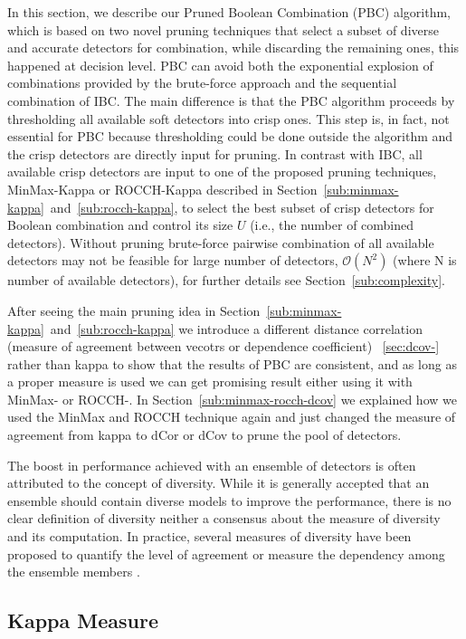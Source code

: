 In this section, we describe our Pruned Boolean Combination (PBC) algorithm, which is based on two novel pruning techniques that select a subset of diverse and accurate detectors for combination, while discarding the remaining ones, this happened at decision level.
PBC can avoid both the exponential explosion of combinations provided by the brute-force approach and the sequential combination of IBC.
The main difference is that the PBC algorithm proceeds by thresholding all available soft detectors into crisp ones.
This step is, in fact, not essential for PBC because thresholding could be done outside the algorithm and the crisp detectors are directly input for pruning.
In contrast with IBC, all available crisp detectors are input to one of the proposed pruning techniques, MinMax-Kappa or ROCCH-Kappa described in Section~\ref{sub:minmax-kappa}~and~\ref{sub:rocch-kappa}, to select the best subset of crisp detectors for Boolean combination and control its size $U$ (i.e., the number of combined detectors).
Without pruning brute-force pairwise combination of all available detectors may not be feasible for large number of detectors, $\mathcal{O}({N^2})$ (where N is number of available detectors), for further details see Section~\ref{sub:complexity}.
 
After seeing the main pruning idea in Section~\ref{sub:minmax-kappa}~and~\ref{sub:rocch-kappa} we introduce a different distance correlation (measure of agreement between vecotrs or dependence coefficient) ~\ref{sec:dcov-} rather than kappa to show that the results of PBC are consistent, and as long as a proper measure is used we can get promising result either using it with MinMax- or ROCCH-. In Section~\ref{sub:minmax-rocch-dcov} we explained how we used the MinMax and ROCCH technique again and just changed the measure of agreement from kappa to dCor or dCov to prune the pool of detectors.

The boost in performance achieved with an ensemble of detectors is often attributed to the concept of diversity.
While it is generally accepted that an ensemble should contain diverse models to improve the performance, there is no clear definition of diversity neither a consensus about the measure of diversity and its computation.
In practice, several measures of diversity have been proposed to quantify the level of agreement or measure the dependency among the ensemble members \cite{Kuncheva2003b}.


\subsection{Kappa Measure}
\label{sec:kappa}

